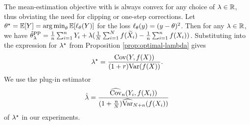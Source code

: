 \begin{example}
  \label{example:mean-tuning}
  The mean-estimation objective with \ppipp is always
  convex for any choice of $\lambda \in \mathbb{R}$, thus obviating the need
  for clipping or one-step corrections.
  Let $\theta^\star = \mathbb{E}[Y] = \operatorname*{arg\,min}_\theta \mathbb{E}[\ell_\theta(Y)]$
  for the loss $\ell_\theta(y) = (y-\theta)^2$.
  Then for any $\lambda \in \mathbb{R}$, we have
  $\hat{\theta}^{\mathrm{PP}}_\lambda = \frac{1}{n} \sum_{i = 1}^n Y_i
  + \lambda(\frac{1}{N} \sum_{i = 1}^N f(\widetilde{X}_i) - \frac{1}{n}
  \sum_{i = 1}^n f(X_i))$.
  Substituting into the
  expression for $\lambda^\star$ from Proposition \ref{prop:optimal-lambda}
  gives
  \begin{equation*}
    \lambda^\star = \frac{\mathrm{Cov}(Y,f(X))}{(1+r)\mathrm{Var}(f(X))}.
  \end{equation*}
  We use the plug-in estimator
  \begin{equation*}
    \hat\lambda = \frac{\widehat{\mathrm{Cov}}_n(Y_i,f(X_i))}{(1+\frac n N )\widehat {\mathrm{Var}}_{N+n}(f(X_i))}
  \end{equation*}
   of $\lambda^\star$ in our experiments.
\end{example}




